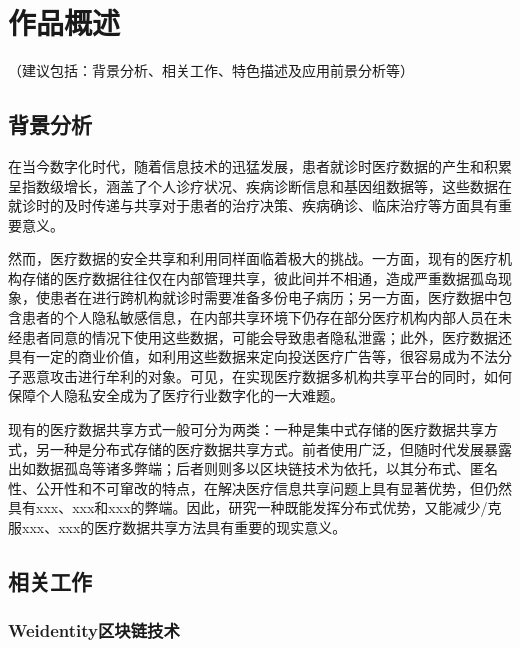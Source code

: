 \documentclass{cumcmthesis}
\numberwithin{equation}{section} %
\numberwithin{figure}{section} %
\numberwithin{table}{section} %
\begin{document}
\begin{enabstract}


\end{enabstract}

\section{作品概述}

（建议包括：背景分析、相关工作、特色描述及应用前景分析等） 

\subsection{背景分析}

在当今数字化时代，随着信息技术的迅猛发展，患者就诊时医疗数据的产生和积累呈指数级增长，涵盖了个人诊疗状况、疾病诊断信息和基因组数据等，这些数据在就诊时的及时传递与共享对于患者的治疗决策、疾病确诊、临床治疗等方面具有重要意义。

然而，医疗数据的安全共享和利用同样面临着极大的挑战。一方面，现有的医疗机构存储的医疗数据往往仅在内部管理共享，彼此间并不相通，造成严重数据孤岛现象，使患者在进行跨机构就诊时需要准备多份电子病历；另一方面，医疗数据中包含患者的个人隐私敏感信息，在内部共享环境下仍存在部分医疗机构内部人员在未经患者同意的情况下使用这些数据，可能会导致患者隐私泄露；此外，医疗数据还具有一定的商业价值，如利用这些数据来定向投送医疗广告等，很容易成为不法分子恶意攻击进行牟利的对象。可见，在实现医疗数据多机构共享平台的同时，如何保障个人隐私安全成为了医疗行业数字化的一大难题。

现有的医疗数据共享方式一般可分为两类：一种是集中式存储的医疗数据共享方式，另一种是分布式存储的医疗数据共享方式。前者使用广泛，但随时代发展暴露出如数据孤岛等诸多弊端；后者则则多以区块链技术为依托，以其分布式、匿名性、公开性和不可窜改的特点，在解决医疗信息共享问题上具有显著优势，但仍然具有xxx、xxx和xxx的弊端。因此，研究一种既能发挥分布式优势，又能减少/克服xxx、xxx的医疗数据共享方法具有重要的现实意义。

\subsection{相关工作}

\subsubsection{Weidentity区块链技术}
\end{document}
